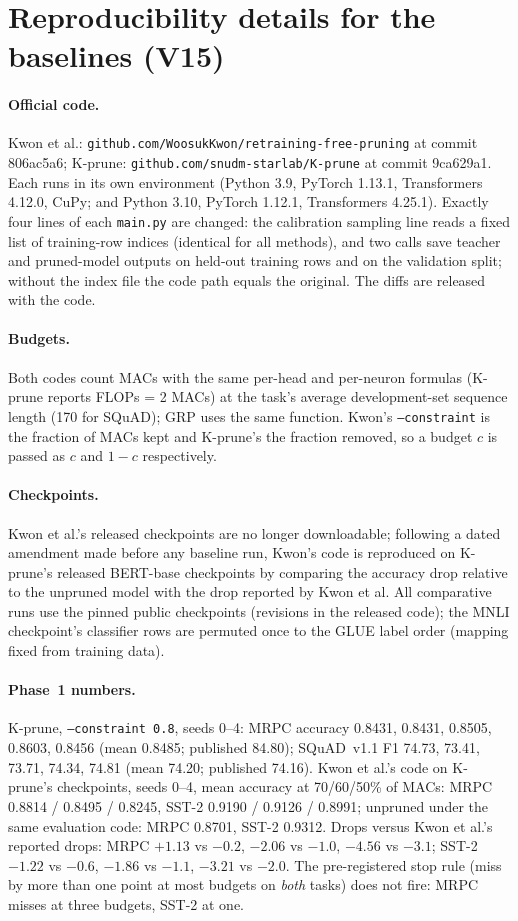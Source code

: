 \documentclass[11pt]{article}
\begin{document}
\appendix
\section{Reproducibility details for the baselines (V15)}\label{app:repro}
\paragraph{Official code.} Kwon et al.: \texttt{github.com/WoosukKwon/retraining-free-pruning} at commit 806ac5a6;
K-prune: \texttt{github.com/snudm-starlab/K-prune} at commit 9ca629a1. Each runs in its own environment (Python 3.9,
PyTorch 1.13.1, Transformers 4.12.0, CuPy; and Python 3.10, PyTorch 1.12.1, Transformers 4.25.1). Exactly four lines
of each \texttt{main.py} are changed: the calibration sampling line reads a fixed list of training-row indices
(identical for all methods), and two calls save teacher and pruned-model outputs on held-out training rows and on the
validation split; without the index file the code path equals the original. The diffs are released with the code.
\paragraph{Budgets.} Both codes count MACs with the same per-head and per-neuron formulas (K-prune reports FLOPs =
2 MACs) at the task's average development-set sequence length (170 for SQuAD); GRP uses the same function. Kwon's
\texttt{--constraint} is the fraction of MACs kept and K-prune's the fraction removed, so a budget $c$ is passed as
$c$ and $1-c$ respectively.
\paragraph{Checkpoints.} Kwon et al.'s released checkpoints are no longer downloadable; following a dated amendment
made before any baseline run, Kwon's code is reproduced on K-prune's released BERT-base checkpoints by comparing the
accuracy drop relative to the unpruned model with the drop reported by Kwon et al. All comparative runs use the
pinned public checkpoints (revisions in the released code); the MNLI checkpoint's classifier rows are permuted once to the GLUE
label order (mapping fixed from training data).
\paragraph{Phase~1 numbers.} K-prune, \texttt{--constraint 0.8}, seeds 0--4: MRPC accuracy 0.8431, 0.8431, 0.8505,
0.8603, 0.8456 (mean 0.8485; published 84.80); SQuAD~v1.1 F1 74.73, 73.41, 73.71, 74.34, 74.81 (mean 74.20; published
74.16). Kwon et al.'s code on K-prune's checkpoints, seeds 0--4, mean accuracy at 70/60/50\% of MACs: MRPC 0.8814 /
0.8495 / 0.8245, SST-2 0.9190 / 0.9126 / 0.8991; unpruned under the same evaluation code: MRPC 0.8701, SST-2 0.9312.
Drops versus Kwon et al.'s reported drops: MRPC $+1.13$ vs $-0.2$, $-2.06$ vs $-1.0$, $-4.56$ vs $-3.1$; SST-2 $-1.22$ vs
$-0.6$, $-1.86$ vs $-1.1$, $-3.21$ vs $-2.0$. The pre-registered stop rule (miss by more than one point at most budgets
on \emph{both} tasks) does not fire: MRPC misses at three budgets, SST-2 at one.



\end{document}

